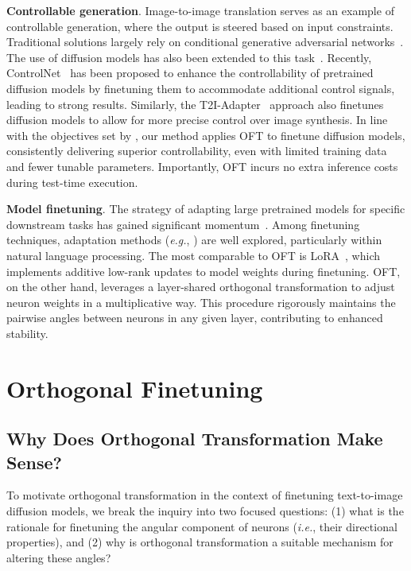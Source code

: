 \textbf{Controllable generation}. Image-to-image translation serves as an example of controllable generation, where the output is steered based on input constraints. Traditional solutions largely rely on conditional generative adversarial networks~\cite{isola2017image,zhu2017toward,wang2018high,park2019semantic,choi2018stargan}. The use of diffusion models has also been extended to this task~\cite{saharia2022palette,voynov2022sketch,wang2022pretraining}. Recently, ControlNet~\cite{zhang2023adding} has been proposed to enhance the controllability of pretrained diffusion models by finetuning them to accommodate additional control signals, leading to strong results. Similarly, the T2I-Adapter~\cite{mou2023t2i} approach also finetunes diffusion models to allow for more precise control over image synthesis. In line with the objectives set by \cite{zhang2023adding,mou2023t2i}, our method applies OFT to finetune diffusion models, consistently delivering superior controllability, even with limited training data and fewer tunable parameters. Importantly, OFT incurs no extra inference costs during test-time execution.

\textbf{Model finetuning}. The strategy of adapting large pretrained models for specific downstream tasks has gained significant momentum~\cite{devlin2018bert,brown2020language,he2022masked}. Among finetuning techniques, adaptation methods (\emph{e.g.}, \cite{hulora2022,houlsby2019parameter,pfeiffer2020adapterfusion}) are well explored, particularly within natural language processing. The most comparable to OFT is LoRA~\cite{hulora2022}, which implements additive low-rank updates to model weights during finetuning. OFT, on the other hand, leverages a layer-shared orthogonal transformation to adjust neuron weights in a multiplicative way. This procedure rigorously maintains the pairwise angles between neurons in any given layer, contributing to enhanced stability.

\section{Orthogonal Finetuning}

\subsection{Why Does Orthogonal Transformation Make Sense?}

To motivate orthogonal transformation in the context of finetuning text-to-image diffusion models, we break the inquiry into two focused questions: (1) what is the rationale for finetuning the angular component of neurons (\emph{i.e.}, their directional properties), and (2) why is orthogonal transformation a suitable mechanism for altering these angles?

